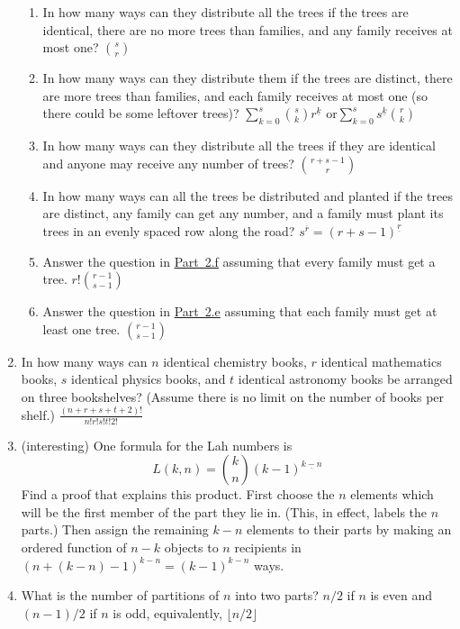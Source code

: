 \documentclass[10pt,]{book}
\theoremstyle{plain}
\theoremstyle{definition}
\numberwithin{equation}{chapter}
\begin{document}
\begin{enumerate}
\begin{enumerate}
%
\item\hypertarget{li-59}{}In how many ways can they distribute all the trees if the trees are identical, there are no more trees than families,   and any family receives at most one? \(\binom{s}{r}\)%
%
\item\hypertarget{li-60}{}In how many ways can they distribute them if the trees are distinct, there are more trees than families, and each family receives at most one (so there could be some leftover trees)? \(\sum_{k=0}^s \binom{s}{k}r^{\underline{k}}\) or\(\sum_{k=0}^s s^{\underline{k}}\binom{r}{k}\)%
%
\item\hypertarget{multisetproblem}{}In how many ways can they distribute all the trees if they are identical and anyone may receive any number of trees? \(\binom{r+s-1}{r}\)%
%
\item\hypertarget{orderedfunctionproblem}{}In how many ways can all the trees be distributed and planted if the trees are distinct, any family can get any number, and a family must plant its trees in an evenly spaced row along the road? \(s^{\overline{r}}=(r+s-1)^{\underline{r}}\)%
%
\item\hypertarget{li-63}{}Answer the question in \hyperlink{orderedfunctionproblem}{Part~2.f} assuming that every family must get a tree. \(r!\binom{r-1}{s-1}\)%
%
\item\hypertarget{li-64}{}Answer the question in \hyperlink{multisetproblem}{Part~2.e} assuming that each family must get at least one tree. \(\binom{r-1}{s-1}\)%
%
\end{enumerate}
%
\item\hypertarget{li-65}{}In how many ways can \(n\) identical chemistry books, \(r\) identical mathematics books, \(s\) identical physics books, and \(t\) identical astronomy books be arranged on three bookshelves? (Assume there is no limit on the number of books per shelf.) \(\frac{(n+r+s+t+2)! }{n!r!s!t!2!}\)%
%
\item\hypertarget{li-66}{}(interesting) One formula for the Lah numbers is%
\begin{equation*}
L(k,n) = \binom{k}{n}(k-1)^{\underline{k-n}}
\end{equation*}
Find a proof that explains this product. First choose the \(n\) elements which will be the first member of the part they lie in. (This, in effect, labels the \(n\) parts.) Then assign the remaining \(k-n\) elements to their parts by making an ordered function of \(n-k\) objects to \(n\) recipients in \((n + (k-n) - 1)^{{k-n}} = (k-1)^{{k-n}}\) ways.%
%
\item\hypertarget{li-67}{}What is the number of partitions of \(n\) into two parts? \(n/2\) if \(n\) is even and \((n-1)/2\) if \(n\) is odd, equivalently, \(\lfloor n/2\rfloor\)%

\end{enumerate}
\end{document}
